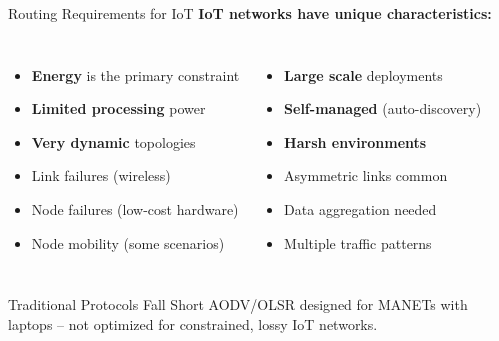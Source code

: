 \documentclass[aspectratio=169,11pt]{beamer}
\begin{document}
\begin{frame}{Routing Requirements for IoT}
    \textbf{IoT networks have unique characteristics:}
    
    \vspace{0.3cm}
    \begin{columns}
        \begin{itemize}
            \item \textbf{Energy} is the primary constraint
            \item \textbf{Limited processing} power
            \item \textbf{Very dynamic} topologies
            \item Link failures (wireless)
            \item Node failures (low-cost hardware)
            \item Node mobility (some scenarios)
        \end{itemize}
        
        \begin{itemize}
            \item \textbf{Large scale} deployments
            \item \textbf{Self-managed} (auto-discovery)
            \item \textbf{Harsh environments}
            \item Asymmetric links common
            \item Data aggregation needed
            \item Multiple traffic patterns
        \end{itemize}
    \end{columns}
    
    \vspace{0.3cm}
    \begin{alertblock}{Traditional Protocols Fall Short}
        AODV/OLSR designed for MANETs with laptops -- not optimized for constrained, lossy IoT networks.
    \end{alertblock}
\end{frame}
\end{document}
